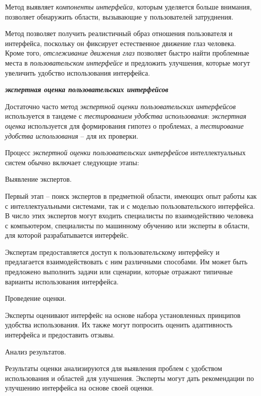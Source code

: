 Метод выявляет \textit{компоненты интерфейса}, которым уделяется больше внимания, позволяет обнаружить области, вызывающие у пользователей затруднения.

Метод позволяет получить реалистичный образ отношения пользователя и интерфейса, поскольку он фиксирует естественное движение глаз человека. Кроме того, \textit{отслеживание движения глаз} позволяет быстро найти проблемные места в \textit{пользовательском интерфейсе} и предложить улучшения, которые могут увеличить удобство использования интерфейса.


\textbf{\textit{экспертная оценка пользовательских интерфейсов}} 

Достаточно часто метод \textit{экспертной оценки пользовательских интерфейсов} используется в тандеме с \textit{тестированием удобства использования}: \textit{экспертная оценка} используется для формирования гипотез о проблемах, а \textit{тестирование удобства использования} -- для их проверки.

Процесс \textit{экспертной оценки пользовательских интерфейсов} интеллектуальных систем обычно включает следующие этапы:

\begin{textitemize}
\item Выявление экспертов. 

Первый этап -- поиск экспертов в предметной области, имеющих опыт работы как с интеллектуальными системами, так и с моделью пользовательского интерфейса. В число этих экспертов могут входить специалисты по взаимодействию человека с компьютером, специалисты по машинному обучению или эксперты в области, для которой разрабатывается интерфейс.

Экспертам предоставляется доступ к пользовательскому интерфейсу и предлагается взаимодействовать с ним различными способами. Им может быть предложено выполнить задачи или сценарии, которые отражают типичные варианты использования интерфейса.

\item Проведение оценки. 

Эксперты оценивают интерфейс на основе набора установленных принципов удобства использования. Их также могут попросить оценить адаптивность интерфейса и предоставить отзывы.

\item Анализ результатов. 

Результаты оценки анализируются для выявления проблем с удобством использования и областей для улучшения. Эксперты могут дать рекомендации по улучшению интерфейса на основе своей оценки.
\end{textitemize}


